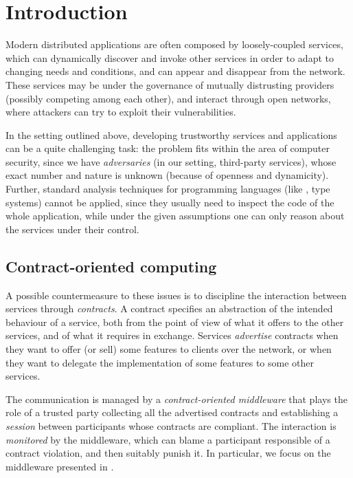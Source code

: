 \section{Introduction}


Modern distributed applications are often composed 
by loosely-coupled services, 
which can dynamically discover and invoke other services
in order to adapt to changing needs and conditions,
and can appear and disappear from the network. %
These services may be under the governance of mutually distrusting providers 
(possibly competing among each other), 
and interact through open networks, %
where attackers can try to exploit their vulnerabilities. %

In the setting outlined above, %
developing trustworthy services and applications 
can be a quite challenging task:
the problem fits within the area of computer security,
since we have \emph{adversaries} (in our setting, third-party services),
whose exact number and nature is unknown 
(because of openness and dynamicity). %
%
Further, standard analysis techniques for programming languages
(like \eg, type systems) cannot be applied, 
since they usually need to inspect the code of the whole application,
while under the given assumptions one can only %
reason about the services under their control. %

\subsection*{Contract-oriented computing}

A possible countermeasure to these issues is to discipline the interaction
between services through \emph{contracts}.
A contract specifies an abstraction of the intended behaviour of a service,
both from the point of view of what it offers to the other services, 
and of what it requires in exchange.
Services \emph{advertise} contracts when they want to offer 
(or sell) some features to clients over the network, or when 
they want to delegate the implementation of some features to some other services.

The communication is managed by a \emph{contract-oriented middleware}
that plays the role of a trusted party collecting
all the advertised contracts and establishing a \textit{session}
between participants whose contracts are compliant. %
The interaction is \textit{monitored} by the middleware, %
which can blame a participant responsible of
a contract violation, and then suitably punish it. 
%
In particular, we focus on the middleware presented in \cite{CO2middleware}.


